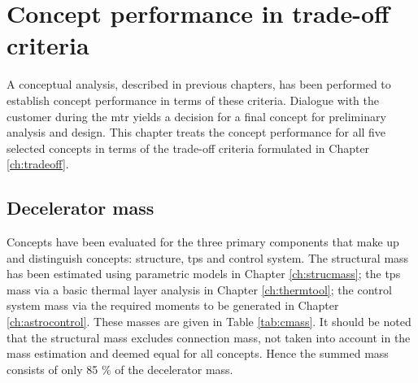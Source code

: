 \section{Concept performance in trade-off criteria}\label{ch:tfsum}

 A conceptual analysis, described in previous chapters, has been performed to establish concept performance in terms of these criteria. Dialogue with the customer during the \acrfull{mtr} yields a decision for a final concept for preliminary analysis and design. This chapter treats the concept performance for all five selected concepts in terms of the trade-off criteria formulated in Chapter \ref{ch:tradeoff}.

\subsection{Decelerator mass}
Concepts have been evaluated for the three primary components that make up and distinguish concepts: structure, \acrfull{tps} and control system. The structural mass has been estimated using parametric models in Chapter \ref{ch:strucmass}; the \gls{tps} mass via a basic thermal layer analysis in Chapter \ref{ch:thermtool}; the control system mass via the required moments to be generated in Chapter \ref{ch:astrocontrol}.  These masses are given in Table \ref{tab:cmass}. It should be noted that the structural mass excludes connection mass, not taken into account in the mass estimation and deemed equal for all concepts. Hence the summed mass consists of only 85 $\%$ of the decelerator mass.

